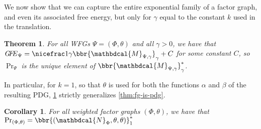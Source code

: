 \documentclass[letterpaper]{article} %
\theoremstyle{plain}
\newtheorem{theorem}{Theorem}[section]
\newtheorem{coro}{Corollary}[theorem]
\theoremstyle{definition}
\theoremstyle{remark}
\newcommand{\begthm}[3][]{\begin{#2}[{name=#1},restate=#3,label=#3]}
\newcommand{\dg}[1]{\mathbdcal{#1}}
\newcommand{\UPDGof}[1]{{\dg N}_{#1}}
\newcommand\GFE{\mathit{G\mkern-4mu F\mkern-4.5mu E}}
\begin{document}



We now show that we can capture the entire exponential family of a factor graph,
and even its associated free energy, 
but only for $\gamma$ equal to the constant $k$ used in
the translation.  


\begin{theorem}\label{thm:wfg-is-pdg}
For all WFGs $\Psi = (\Phi,\theta)$ and all $\gamma > 0$,
we have that
$\GFE_\Psi
= \nicefrac1{\gamma} \bbr{{\dg M}_{\Psi,\gamma}}_{\gamma} 
+ C$   
for some constant $C$, so
$\Pr_{\Psi}$ is the unique element of
$\bbr{{\dg M}_{\Psi,\gamma}}_{\gamma}^*$.
\end{theorem}

In particular, for $k\!=\!1$, so that $\theta$ is used for both the functions
$\alpha$ and $\beta$ of the resulting PDG,
\cref{thm:wfg-is-pdg} strictly generalizes \cref{thm:fg-is-pdg}.
\begin{coro}
	For all weighted factor graphs $(\Phi, \theta)$,
	we have that
	$\Pr_{(\Phi,\theta)} = \bbr{(\UPDGof{\Phi}, \theta,\theta)}_1^*$
\end{coro}
\end{document}
